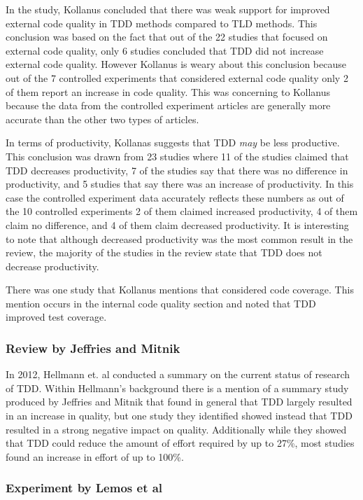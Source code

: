 \documentclass{sig-alternate}
\begin{document}
 In the study, Kollanus concluded that there was weak support for improved external code quality in TDD methods compared to TLD methods.  This conclusion was based on the fact that out of the 22 studies that focused on external code quality, only 6 studies concluded that TDD did not increase external code quality.  However Kollanus is weary about this conclusion because out of the 7 controlled experiments that considered external code quality only 2 of them report an increase in code quality.  This was concerning to Kollanus because the data from the controlled experiment articles are generally more accurate than the other two types of articles.  
 
In terms of productivity, Kollanas suggests that TDD \textit{may} be less productive. This conclusion was drawn from 23 studies where 11 of the studies claimed that TDD decreases productivity, 7 of the studies say that there was no difference in productivity, and 5 studies that say there was an increase of productivity.  In this case the controlled experiment data accurately reflects these numbers as out of the 10 controlled experiments 2 of them claimed increased productivity, 4 of them claim no difference, and 4 of them claim decreased productivity.  It is interesting to note that although decreased productivity was the most common result in the review, the majority of the studies in the review state that TDD does not decrease productivity.
 
There was one study that Kollanus mentions that considered code coverage.  This mention occurs in the internal code quality section and noted that TDD improved test coverage.

\subsubsection{Review by Jeffries and Mitnik}

In 2012, Hellmann et. al conducted a summary on the current status of research of TDD.  Within Hellmann's background there is a mention of a summary study produced by Jeffries and Mitnik that found in general that TDD largely resulted in an increase in quality, but one study they identified showed instead that TDD resulted in a strong negative impact on quality.  Additionally while they showed that TDD could reduce the amount of effort required by up to 27\%, most studies found an increase in effort of up to 100\%.

\subsubsection{Experiment by Lemos et al} 
\end{document}
